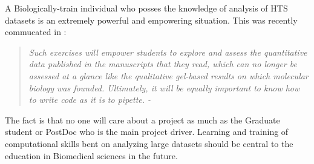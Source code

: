     A Biologically-train individual who posses the knowledge of analysis of HTS datasets is an extremely powerful and empowering situation. This was recently commucated in \citet{Plocik2013}:

    \begin{quote} %
      \itshape 
      Such exercises will empower students to explore and assess the quantitative data published in the manuscripts that they read, which can no longer be assessed at a glance like the qualitative gel-based results on which molecular biology was founded. Ultimately, it will be equally important to know how to write code as it is to pipette. - \citep{Plocik2013}
      \singlespacing
      \end{quote}

    The fact is that no one will care about a project as much as the Graduate student or PostDoc who is the main project driver. Learning and training of computational skills bent on analyzing large datasets should be central to the education in Biomedical sciences in the future.
